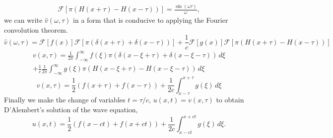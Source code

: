 {\begin{Solution}
\begin{gather*}
    \\
    \mathcal{F}[\pi ( H(x+\tau) - H(x-\tau) )] = \frac{\sin(\omega \tau)}{\omega},
  \end{gather*}
  we can write $\hat{v}(\omega,\tau)$ in a form that is conducive to applying
  the Fourier convolution theorem.
  \[
  \hat{v}(\omega,\tau) = 
  \mathcal{F}[f(x)] \mathcal{F}[\pi ( \delta(x+\tau) + \delta(x-\tau))] +
  \frac{1}{c} \mathcal{F}[g(x)] \mathcal{F}[\pi ( H(x+\tau) - H(x-\tau) )]
  \]
  \begin{multline*}
    v(x,\tau) = 
    \frac{1}{2\pi} \int_{-\infty}^\infty f(\xi) 
    \pi ( \delta(x-\xi+\tau)+\delta(x-\xi-\tau)) \,d\xi \\
    + \frac{1}{c} \frac{1}{2\pi} \int_{-\infty}^\infty g(\xi) \pi (H(x-\xi+\tau)-H(x-\xi-\tau))
    \,d\xi
  \end{multline*}
  \[
  v(x,\tau) = \frac{1}{2} (f(x+\tau) + f(x-\tau))
  + \frac{1}{2c} \int_{x-\tau}^{x+\tau} g(\xi) \,d\xi
  \]
  Finally we make the change of variables $t = \tau/c$, $u(x,t)=v(x,\tau)$
  to obtain D'Alembert's solution of the wave equation,
  \[
  \boxed{
    u(x,t) = \frac{1}{2} (f(x - ct) + f(x + ct))
    + \frac{1}{2c} \int_{x-ct}^{x+ct} g(\xi)\,d\xi.
    }
  \]
\end{Solution}



}
